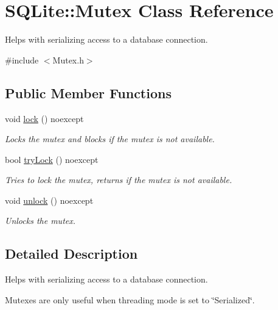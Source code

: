 \hypertarget{a00009}{\section{S\-Q\-Lite\-:\-:Mutex Class Reference}
\label{a00009}
}


Helps with serializing access to a database connection.  




{\ttfamily \#include $<$Mutex.\-h$>$}

\subsection*{Public Member Functions}
\begin{DoxyCompactItemize}
\item 
\hypertarget{a00009_a56ba1f0c1411940ab52279497d15812a}{void \hyperlink{a00009_a56ba1f0c1411940ab52279497d15812a}{lock} () noexcept}\label{a00009_a56ba1f0c1411940ab52279497d15812a}

\begin{DoxyCompactList}\small\item\em Locks the mutex and blocks if the mutex is not available. \end{DoxyCompactList}\item 
bool \hyperlink{a00009_a95b5ebd5fef0bd37b30e3867d60389f8}{try\-Lock} () noexcept
\begin{DoxyCompactList}\small\item\em Tries to lock the mutex, returns if the mutex is not available. \end{DoxyCompactList}\item 
\hypertarget{a00009_ad9238aeb94205ac18d67c9652dcc6ef9}{void \hyperlink{a00009_ad9238aeb94205ac18d67c9652dcc6ef9}{unlock} () noexcept}\label{a00009_ad9238aeb94205ac18d67c9652dcc6ef9}

\begin{DoxyCompactList}\small\item\em Unlocks the mutex. \end{DoxyCompactList}\end{DoxyCompactItemize}


\subsection{Detailed Description}
Helps with serializing access to a database connection. 

Mutexes are only useful when threading mode is set to \char`\"{}\-Serialized\char`\"{}.


